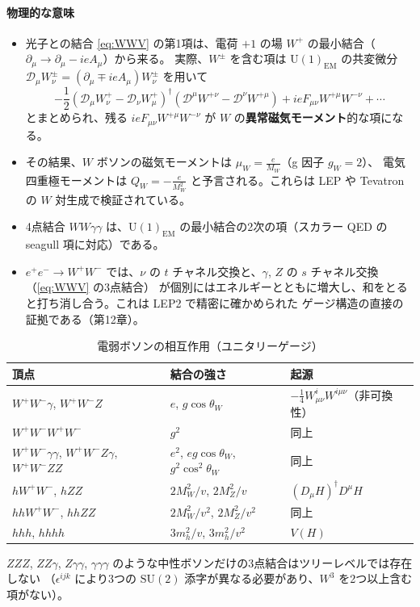 \documentclass[uplatex,dvipdfmx,a4paper,11pt,openany]{jsbook}
\numberwithin{equation}{chapter}
\theoremstyle{definition}
\theoremstyle{plain}
\theoremstyle{remark}
\newcommand{\SU}{\mathrm{SU}}
\newcommand{\U}{\mathrm{U}}
\begin{document}
\paragraph{物理的な意味}
\begin{itemize}
    \item 光子との結合 \eqref{eq:WWV} の第1項は、電荷 $+1$ の場 $W^+$ の最小結合（$\partial_\mu\to\partial_\mu-ieA_\mu$）から来る。
    実際、$W^\pm$ を含む項は $\U(1)_{\mathrm{EM}}$ の共変微分 $\mathcal D_\mu W^\pm_\nu=(\partial_\mu\mp ieA_\mu)W^\pm_\nu$ を用いて
    \[
    -\frac12\left(\mathcal D_\mu W^+_\nu-\mathcal D_\nu W^+_\mu\right)^\dagger\left(\mathcal D^\mu W^{+\nu}-\mathcal D^\nu W^{+\mu}\right)
    +ieF_{\mu\nu}W^{+\mu}W^{-\nu}+\cdots
    \]
    とまとめられ、残る $ieF_{\mu\nu}W^{+\mu}W^{-\nu}$ が $W$ の\textbf{異常磁気モーメント}的な項になる。
    \item その結果、$W$ ボソンの磁気モーメントは $\mu_W=\frac{e}{M_W}$（g 因子 $g_W=2$）、
    電気四重極モーメントは $Q_W=-\frac{e}{M_W^2}$ と予言される。これらは LEP や Tevatron の $W$ 対生成で検証されている。
    \item 4点結合 $WW\gamma\gamma$ は、$\U(1)_{\mathrm{EM}}$ の最小結合の2次の項（スカラー QED の seagull 項に対応）である。
    \item $e^+e^-\to W^+W^-$ では、$\nu$ の $t$ チャネル交換と、$\gamma$, $Z$ の $s$ チャネル交換（\eqref{eq:WWV} の3点結合）
    が個別にはエネルギーとともに増大し、和をとると打ち消し合う。これは LEP2 で精密に確かめられた
    ゲージ構造の直接の証拠である（第12章）。
\end{itemize}
\begin{table}[htbp]
\centering
\caption{電弱ボソンの相互作用（ユニタリーゲージ）}
\label{tab:EW-boson-vertices}
\begin{tabular}{lll}
\toprule
頂点 & 結合の強さ & 起源\\
\midrule
$W^+W^-\gamma$, $W^+W^-Z$ & $e$, $g\cos\theta_W$ & $-\frac14W^i_{\mu\nu}W^{i\mu\nu}$（非可換性）\\
$W^+W^-W^+W^-$ & $g^2$ & 同上\\
$W^+W^-\gamma\gamma$, $W^+W^-Z\gamma$, $W^+W^-ZZ$ & $e^2$, $eg\cos\theta_W$, $g^2\cos^2\theta_W$ & 同上\\
$hW^+W^-$, $hZZ$ & $2M_W^2/v$, $2M_Z^2/v$ & $(D_\mu H)^\dagger D^\mu H$\\
$hhW^+W^-$, $hhZZ$ & $2M_W^2/v^2$, $2M_Z^2/v^2$ & 同上\\
$hhh$, $hhhh$ & $3m_h^2/v$, $3m_h^2/v^2$ & $V(H)$\\
\bottomrule
\end{tabular}
\end{table}
$ZZZ$, $ZZ\gamma$, $Z\gamma\gamma$, $\gamma\gamma\gamma$ のような中性ボソンだけの3点結合はツリーレベルでは存在しない
（$\epsilon^{ijk}$ により3つの $\SU(2)$ 添字が異なる必要があり、$W^3$ を2つ以上含む項がない）。
\end{document}
